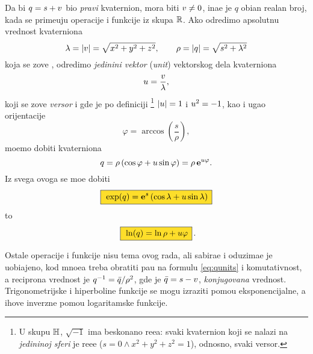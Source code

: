 Da bi $q=s+{v}$ bio {\sl pravi\/} kvaternion, mora biti ${v}\ne0$, ina{\cv}e je $q$ obi{\cv}an realan broj, 
kada se prime{\nj}uju operacije i funkcije iz skupa ${\mathbb R}$.
Ako odredimo apsolutnu vrednost kvaterniona
$$
\lambda = {\vert{v}\vert} = \sqrt{\mathstrut x^2+y^2+z^2},\qquad
\rho = {\vert q\vert} = \sqrt{\mathstrut s^2+\lambda^2}
$$
koja se zove {\sl {}\/}, odredimo
{\sl jedini{\cv}ni vektor\/} ({\sl unit\/}) vektorskog dela kvaterniona
$$
{u} = \frac {{v}}\lambda, 
$$
koji se zove {\sl versor\/}
i gde je po definiciji%
\footnote{U skupu ${\mathbb H}$, $\sqrt{-1}$ ima beskona{\cv}no re{\sv}e{\nj}a:
svaki kvaternion koji se nalazi na {\sl jedini{\cv}noj sferi\/} je re{\sv}e{\nj}e
($s=0\land x^2+y^2+z^2=1$), odnosno, svaki versor.} 
${\vert{u}\vert}=1$ i  ${u}^2=-1$,
kao i ugao orijentacije
$$
\varphi = \arccos\left( \frac s\rho \right),
$$
mo{\zv}emo dobiti  kvaterniona
\begin{equation}
q
=\rho\,(\cos\varphi + {u}\sin\varphi)
=\rho\,{\bf e}^{{u}\varphi}.
\end{equation}
Iz svega ovoga se mo{\zv}e dobiti
\begin{equation}\index{exp@$\exp$}
    \okvir{\exp(q) = \e^s \left( \cos\lambda + \uv\sin\lambda \right)}
\end{equation}
\hbox to \textwidth{\hss i\hss}
\begin{equation}\index{ln@$\ln$}
    \okvir{\ln(q)  = \ln\rho + \uv\varphi}\rlap{.}
\end{equation}

\medskip

\danger
Ostale operacije i funkcije nisu tema ovog rada, ali sabira{\nj}e i oduzima{\nj}e
je uobi\-{\cv}a\-jeno, kod mno{\zv}e{\nj}a treba obratiti pa{\zv}{\nj}u na formulu \eqref{eq:qunits} i
komutativnost, a reci\-pro{\cv}na vrednost je
$q^{-1}={\bar q}/\rho^2$, gde je ${\bar q}=s-{v}$, {\sl konjugovana\/} vrednost. 
Tri\-gono\-metrijske i hiperboli{\cv}ne funkcije se mogu izraziti pomo{\cc}u eksponencijalne,
a {\nj}ihove inverzne pomo{\cc}u logaritamske funkcije.\par

